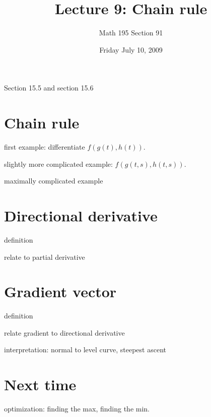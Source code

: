 \documentclass[12pt]{article}
\title{Lecture 9: Chain rule}
\author{Math 195 Section 91}
\date{Friday July 10, 2009}
\begin{document}
\maketitle

Section 15.5 and section 15.6

\section{Chain rule}

first example: differentiate $f(g(t),h(t))$.

slightly more complicated example: $f(g(t,s),h(t,s))$.

maximally complicated example

\section{Directional derivative}

definition

relate to partial derivative

\section{Gradient vector}

definition

relate gradient to directional derivative

interpretation: normal to level curve, steepest ascent

\section{Next time}

optimization: finding the max, finding the min.
\end{document}
